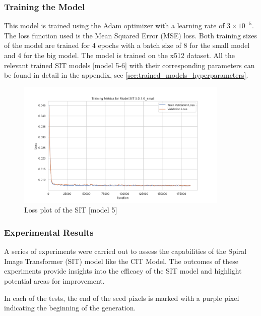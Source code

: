 \subsubsection{Training the Model}

This model is trained using the Adam optimizer with a learning rate of \(3 \times 10^{-5}\). The loss function used is the Mean Squared Error (MSE) loss. Both training sizes of the model are trained for 4 epochs with a batch size of 8 for the small model and 4 for the big model. The model is trained on the x512 dataset. All the relevant trained SIT models [model 5-6] with their corresponding parameters can be found in detail in the appendix, see \autoref{sec:trained_models_hyperparameters}.

\begin{figure}[H]
    \centering
    \includegraphics[width=0.9\textwidth]{imgs/Training_Metrics_SIT 5.0.1.0_small.png}
    \caption{Loss plot of the SIT [model 5]}
    \label{fig:Training_Metrics_SITSmall}
\end{figure}

\subsubsection{Experimental Results}

A series of experiments were carried out to assess the capabilities of the Spiral Image Transformer (SIT) model like the CIT Model. The outcomes of these experiments provide insights into the efficacy of the SIT model and highlight potential areas for improvement.

In each of the tests, the end of the seed pixels is marked with a purple pixel indicating the beginning of the generation.

